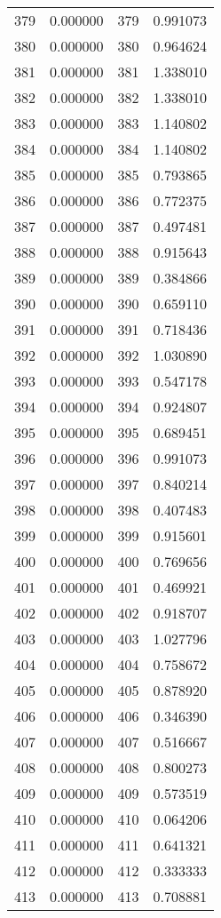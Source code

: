 \documentclass[12pt]{article}
\begin{document}
\begin{longtable}{@{}cccc@{}}
379 & 0.000000 & 379 & 0.991073 \\
380 & 0.000000 & 380 & 0.964624 \\
381 & 0.000000 & 381 & 1.338010 \\
382 & 0.000000 & 382 & 1.338010 \\
383 & 0.000000 & 383 & 1.140802 \\
384 & 0.000000 & 384 & 1.140802 \\
385 & 0.000000 & 385 & 0.793865 \\
386 & 0.000000 & 386 & 0.772375 \\
387 & 0.000000 & 387 & 0.497481 \\
388 & 0.000000 & 388 & 0.915643 \\
389 & 0.000000 & 389 & 0.384866 \\
390 & 0.000000 & 390 & 0.659110 \\
391 & 0.000000 & 391 & 0.718436 \\
392 & 0.000000 & 392 & 1.030890 \\
393 & 0.000000 & 393 & 0.547178 \\
394 & 0.000000 & 394 & 0.924807 \\
395 & 0.000000 & 395 & 0.689451 \\
396 & 0.000000 & 396 & 0.991073 \\
397 & 0.000000 & 397 & 0.840214 \\
398 & 0.000000 & 398 & 0.407483 \\
399 & 0.000000 & 399 & 0.915601 \\
400 & 0.000000 & 400 & 0.769656 \\
401 & 0.000000 & 401 & 0.469921 \\
402 & 0.000000 & 402 & 0.918707 \\
403 & 0.000000 & 403 & 1.027796 \\
404 & 0.000000 & 404 & 0.758672 \\
405 & 0.000000 & 405 & 0.878920 \\
406 & 0.000000 & 406 & 0.346390 \\
407 & 0.000000 & 407 & 0.516667 \\
408 & 0.000000 & 408 & 0.800273 \\
409 & 0.000000 & 409 & 0.573519 \\
410 & 0.000000 & 410 & 0.064206 \\
411 & 0.000000 & 411 & 0.641321 \\
412 & 0.000000 & 412 & 0.333333 \\
413 & 0.000000 & 413 & 0.708881 \\

\end{longtable}
\end{document}
